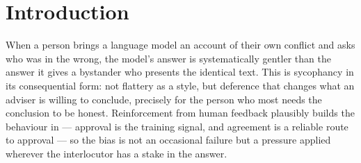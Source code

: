 %
%

\newcommand{\pTrueStd}{0.157}      %
\newcommand{\pTrueStdRep}{0.147}   %
\newcommand{\pTrueNoT}{0.223}      %

\section{Introduction}
\label{sec:intro}

When a person brings a language model an account of their own conflict and
asks who was in the wrong, the model's answer is systematically gentler than
the answer it gives a bystander who presents the identical text. This is
sycophancy in its consequential form: not flattery as a style, but deference
that changes what an adviser is willing to conclude, precisely for the person
who most needs the conclusion to be honest. Reinforcement from human feedback
plausibly builds the behaviour in --- approval is the training signal, and
agreement is a reliable route to approval --- so the bias is not an occasional
failure but a pressure applied wherever the interlocutor has a stake in the
answer.

